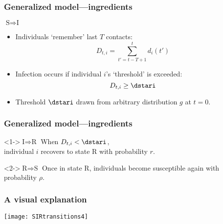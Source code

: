 \begin{frame}
  \frametitle{Generalized model---ingredients}

  \begin{block}{$\boxed{\mbox{S} \Rightarrow \mbox{I}}$}
    \begin{itemize}
    \item<2->
      Individuals `remember' last $T$ contacts:
      $$ D_{t,i} = \sum_{t'=t-T+1}^{t} d_i(t') $$
    \item<3-> 
      Infection occurs if individual $i$'s `threshold' is exceeded:
      $$ D_{t,i} \ge \dstari $$
    \item<4->
      Threshold $\dstari$ drawn from arbitrary distribution \alert{$g$} at $t=0$.
    \end{itemize}
  \end{block}

\end{frame}

\begin{frame}
  \frametitle{Generalized model---ingredients}

  \begin{block}<1->{$\boxed{\mbox{I} \Rightarrow \mbox{R}}$}
    When  $D_{t,i} < \dstari $,\\
    individual $i$ recovers to state R
    with probability $r$.
  \end{block}

  \bigskip
    
  \begin{block}<2->{$\boxed{\mbox{R} \Rightarrow \mbox{S}}$}
    Once in state R, individuals become susceptible again with
    probability $\rho$.
  \end{block}

\end{frame}

\begin{frame}
  \frametitle{A visual explanation}

   \texttt{[image: SIRtransitions4]}

\end{frame}





